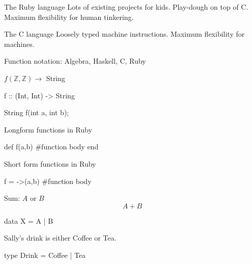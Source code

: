 \documentclass{beamer}
\begin{document}
\begin{frame}[fragile]
The Ruby language\newline\newline
Lots of existing projects for kids.\newline\newline
Play-dough on top of C.\newline\newline
Maximum flexibility for human tinkering.
\end{frame}

\begin{frame}[fragile]
The C language\newline\newline
Loosely typed machine instructions.\newline\newline
Maximum flexibility for machines.
\end{frame}

\begin{frame}[fragile]
Function notation: Algebra, Haskell, C, Ruby\newline\newline

$f(\mathbb{Z},\mathbb{Z}) \rightarrow$ String
\begin{code} 
f :: (Int, Int) -> String
\end{code}
\begin{ccode} 
String f(int a, int b); 
\end{ccode}
\end{frame}


\begin{frame}[fragile]
Longform functions in Ruby
\begin{rcode}
def f(a,b)
  #function body
end 
\end{rcode}

Short form functions in Ruby
\begin{rcode}
f = ->(a,b){
   #function body
}
\end{rcode}
\end{frame}


\begin{frame}[fragile]
Sum: $A$ or $B$\newline\newline
$$A + B $$

\begin{code} 
data X = A | B
\end{code}

Sally's drink is either Coffee or Tea.
\begin{code}
type Drink = Coffee | Tea
\end{code}
\end{frame}
\end{document}
